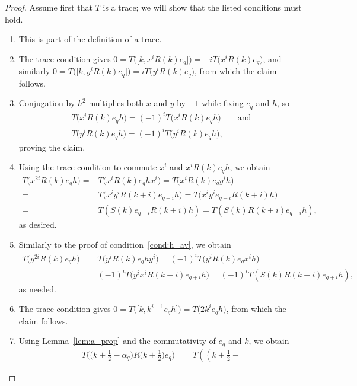 \documentclass[pdftex]{sigma}
\newcommand\numbers{\textup{(\arabic*)}}
\newcommand\half{\ensuremath{\frac{1}{2}}}
\newcommand\thalf{\ensuremath{\tfrac12}}
\numberwithin{equation}{section}
\theoremstyle{definition}
\begin{document}
\begin{proof}
 Assume first that $T$ is a trace;
 we will show that the listed conditions must hold.
 \begin{enumerate}[label=\numbers]\itemsep=0pt
 \item This is part of the definition of a trace.
 \item The trace condition gives
 $0 = T\bigl(\big[k, x^i R(k) e_q\big]\bigr) = -i T\bigl(x^i R(k) e_q\bigr)$,
 and similarly
 $0 = T\bigl(\big[k, y^i R(k) e_q\big]\bigr) = i T\bigl(y^i R(k) e_q\bigr)$,
 from which the claim follows.
 \item Conjugation by $h^2$ multiplies both $x$ and $y$ by $-1$
 while fixing $e_q$ and $h$, so
 \begin{gather*}
 T\bigl(x^i R(k) e_q h\bigr) = (-1)^i T\bigl(x^i R(k) e_q h\bigr) \qquad \text{and}\\
T\bigl(y^i R(k) e_q h\bigr) = (-1)^i T\bigl(y^i R(k) e_q h\bigr),\end{gather*}
 proving the claim.
 \item Using the trace condition
 to commute $x^i$ and $x^i R(k) e_q h$,
 we obtain
 \begin{align*}
 T\bigl(x^{2i} R(k) e_q h\bigr)
 ={}& T\bigl(x^i R(k) e_q h x^i\bigr)= T\bigl(x^i R(k) e_q y^i h\bigr) \\
 ={}& T\bigl(x^i y^i R(k + i) e_{q - i} h\bigr) = T\bigl(x^i y^i e_{q - i} R(k + i) h\bigr) \\
 ={}& T(S(k) e_{q - i} R(k + i) h) = T(S(k) R(k + i) e_{q - i} h),
 \end{align*}
 as desired.
 \item Similarly to the proof of condition~\ref{cond:h_av},
 we obtain
 \begin{align*}
 T\bigl(y^{2i} R(k) e_q h\bigr)
 ={}& T\bigl(y^i R(k) e_q h y^i\bigr)= (-1)^i T\bigl(y^i R(k) e_q x^i h\bigr) \\
 ={}& (-1)^i T\bigl(y^i x^i R(k - i) e_{q + i} h\bigr) = (-1)^i T(S(k) R(k - i) e_{q + i} h),
 \end{align*}
 as needed.
 \item The trace condition gives
 $0 = T\bigl(\big[k, k^{i - 1} e_q h\big]\bigr) = T\bigl(2 k^i e_q h\bigr)$,
 from which the claim follows.
 \item Using Lemma~\ref{lem:a_prop}
 and the commutativity of $e_q$ and $k$, we obtain
 \begin{align*}
 T\bigl( \bigl( k + \thalf - \alpha_q \bigr)
 R\bigl( k + \thalf \bigr) e_q \bigr)
 ={}& T\left( \left( k + \half -

\end{align*}
\end{enumerate}
\end{proof}
\end{document}
